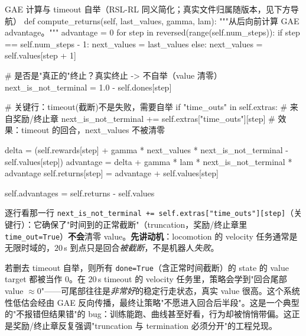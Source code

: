 \begin{codebox}[Python]{GAE 计算与 timeout 自举（RSL-RL 同义简化；真实文件归属随版本，见下方导航）}
def compute_returns(self, last_values, gamma, lam):
    """从后向前计算 GAE advantage。"""
    advantage = 0
    for step in reversed(range(self.num_steps)):
        if step == self.num_steps - 1:
            next_values = last_values
        else:
            next_values = self.values[step + 1]

        # 是否是"真正的"终止？真实终止 -> 不自举（value 清零）
        next_is_not_terminal = 1.0 - self.dones[step]

        # 关键行：timeout(截断)不是失败，需要自举
        if "time_outs" in self.extras:                       # 来自奖励/终止章
            next_is_not_terminal += self.extras["time_outs"][step]
            # 效果：timeout 的回合，next_values 不被清零

        delta = (self.rewards[step]
                 + gamma * next_values * next_is_not_terminal
                 - self.values[step])
        advantage = delta + gamma * lam * next_is_not_terminal * advantage
        self.returns[step] = advantage + self.values[step]

    self.advantages = self.returns - self.values
\end{codebox}

逐行看那一行 \verb|next_is_not_terminal += self.extras["time_outs"][step]|（关键行）：它确保了"时间到的正常截断"（truncation，奖励/终止章里 \verb|time_out=True|）\textbf{不会}清零 value。\textbf{先讲动机}：locomotion 的 velocity 任务通常是无限时域的，$20\,$s 到点只是回合\emph{被截断}，不是机器人\emph{失败}。

\begin{derivation}
若删去 timeout 自举，则所有 \verb|done=True|（含正常时间截断）的 state 的 value target 都被当作 $0$。在 $20\,$s timeout 的 velocity 任务里，策略会学到"回合尾部 value $\approx0$"——可尾部往往是\emph{非常好}的稳定行走状态，真实 value 很高。这个系统性低估会经由 GAE 反向传播，最终让策略"不愿进入回合后半段"。这是一个典型的"不报错但结果错"的 bug：训练能跑、曲线甚至好看，行为却被悄悄带偏。这正是奖励/终止章反复强调"truncation 与 termination 必须分开"的工程兑现。
\end{derivation}

